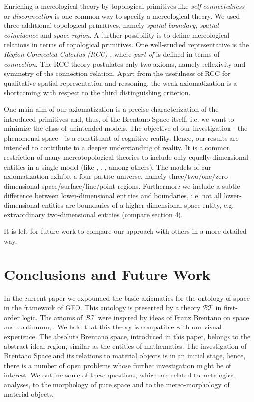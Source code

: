 \documentclass{ao2e}
\begin{document}
{Enriching a mereological theory by topological primitives like \textit{self-connectedness} \cite{Borgo96apointless} or \textit{disconnection} \cite{eschenbach}
is one common way to specify a mereological theory. We used three additional topological primitives, namely \textit{spatial boundary}, \textit{spatial coincidence} and \textit{space region}. 
A further possibility is to define mereological relations in terms of topological primitives. One well-studied representative is the 
\textit{Region Connected Calculus (RCC)} \cite{Randell92aspatial}, where \textit{part of} is defined in terms of \textit{connection}. The RCC theory postulates only two axioms, namely reflexivity and symmetry 
of the connection relation. Apart from the usefulness of RCC for qualitative spatial representation and reasoning, the weak axiomatization is a shortcoming 
with respect to the third distinguishing criterion.

One main aim of our axiomatization is a precise characterization of the introduced primitives and, thus, of the 
Brentano Space itself, i.e. we want to minimize the class of unintended models. The objective of our investigation - the phenomenal space - is a constituant of cognitive reality. Hence, our results are intended to contribute to a deeper understanding of reality. 
It is a common restriction of many mereotopological theories to include only equally-dimensional entities in a single model (like \cite{Borgo96apointless,Randell92aspatial}, \cite{gotts-n-1996-a}, \cite{galton-a-1996-a}, among others). The models of 
our axiomatization exhibit a four-partite universe, namely three/two/one/zero-dimensional space/surface/line/point regions. Furthermore we include a subtle difference between 
lower-dimensional entities and boundaries, i.e. not all lower-dimensional entities are boundaries of a higher-dimensional space entity, e.g. extraordinary two-dimensional entities (compare section 4).

It is left for future work to compare our approach with others in a more detailed way.
    

\section{Conclusions and Future Work}

In the current paper we expounded the basic axiomatics for the ontology of space in the framework of GFO.
This ontology is presented by a theory $\mathcal{BT}$ in first-order logic. The axioms of $\mathcal{BT}$ were inspired by ideas of Franz Brentano on space and continuum, \cite{brentano-f-1976-a}. We hold that this theory is compatible with our visual experience. The absolute Brentano space,
introduced in this paper, belongs to the abstract ideal region, similar as the entities of mathematics.
The investigation of Brentano Space and its relations to material objects is in an initial stage, hence, there is a number of open problems whose further investigation might be of interest. We outline some of these questions, which are related to metalogical analyses, to the morphology of pure space and to the mereo-morphology of material objects. \\

}
\end{document}
